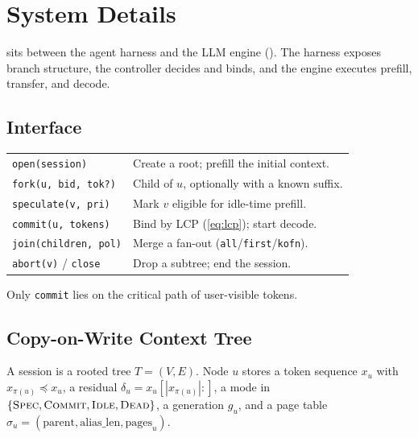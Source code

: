 \section{System Details}
\label{sec:design-full}

\sys sits between the agent harness and the LLM engine ().
The harness exposes branch structure, the controller decides and binds, and the engine executes prefill, transfer, and decode.

\subsection{Interface}
\label{sec:overview}
\begin{center}
\footnotesize
\setlength{\tabcolsep}{3pt}
\begin{tabular}{@{}lp{}@{}}
\toprule
\texttt{open(session)} & Create a root; prefill the initial context. \\
\texttt{fork(u, bid, tok?)} & Child of $u$, optionally with a known suffix. \\
\texttt{speculate(v, pri)} & Mark $v$ eligible for idle-time prefill. \\
\texttt{commit(u, tokens)} & Bind by LCP (\eqref{eq:lcp}); start decode. \\
\texttt{join(children, pol)} & Merge a fan-out (\texttt{all}/\texttt{first}/\texttt{kofn}). \\
\texttt{abort(v)} / \texttt{close} & Drop a subtree; end the session. \\
\bottomrule
\end{tabular}
\end{center}
Only \texttt{commit} lies on the critical path of user-visible tokens.

\subsection{Copy-on-Write Context Tree}
\label{sec:state}

\begin{definition}
A session is a rooted tree $T=(V,E)$.
Node $u$ stores a token sequence $x_u$ with $x_{\pi(u)}\preceq x_u$, a residual $\delta_u=x_u[|x_{\pi(u)}|{:}]$, a mode in $\{\textsc{Spec},\textsc{Commit},\textsc{Idle},\textsc{Dead}\}$, a generation $g_u$, and a page table $\sigma_u=(\mathrm{parent},\mathrm{alias\_len},\mathrm{pages}_u)$.
\end{definition}

